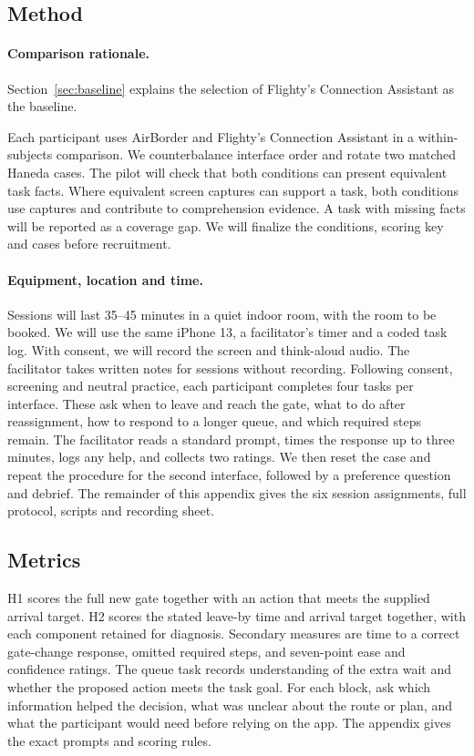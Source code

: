 \documentclass[sigconf,nonacm,balance=false]{acmart}
\begin{document}
\subsection{Method}
\paragraph{Comparison rationale.} Section~\ref{sec:baseline} explains the selection of Flighty's Connection Assistant as the baseline.

Each participant uses AirBorder and Flighty's Connection Assistant in a within-subjects comparison. We counterbalance interface order and rotate two matched Haneda cases. The pilot will check that both conditions can present equivalent task facts. Where equivalent screen captures can support a task, both conditions use captures and contribute to comprehension evidence. A task with missing facts will be reported as a coverage gap. We will finalize the conditions, scoring key and cases before recruitment.

\paragraph{Equipment, location and time.} Sessions will last 35--45 minutes in a quiet indoor room, with the room to be booked. We will use the same iPhone 13, a facilitator's timer and a coded task log. With consent, we will record the screen and think-aloud audio. The facilitator takes written notes for sessions without recording. Following consent, screening and neutral practice, each participant completes four tasks per interface. These ask when to leave and reach the gate, what to do after reassignment, how to respond to a longer queue, and which required steps remain. The facilitator reads a standard prompt, times the response up to three minutes, logs any help, and collects two ratings. We then reset the case and repeat the procedure for the second interface, followed by a preference question and debrief. The remainder of this appendix gives the six session assignments, full protocol, scripts and recording sheet.

\subsection{Metrics}
H1 scores the full new gate together with an action that meets the supplied arrival target. H2 scores the stated leave-by time and arrival target together, with each component retained for diagnosis. Secondary measures are time to a correct gate-change response, omitted required steps, and seven-point ease and confidence ratings. The queue task records understanding of the extra wait and whether the proposed action meets the task goal. For each block, ask which information helped the decision, what was unclear about the route or plan, and what the participant would need before relying on the app. The appendix gives the exact prompts and scoring rules.
\end{document}
